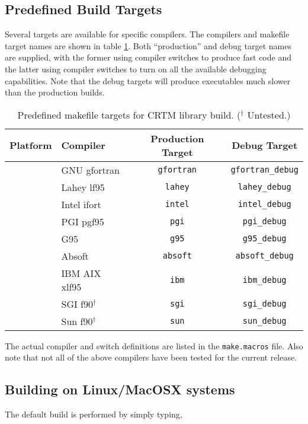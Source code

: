 \subsection{Predefined Build Targets}
Several targets are available for specific compilers. The compilers and makefile target names are shown in table \ref{tab:predefined_build_targets}. Both ``production'' and debug target names are supplied, with the former using compiler switches to produce fast code and the latter using compiler switches to turn on all the available debugging capabilities. Note that the debug targets will produce executables much slower than the production builds. 
\begin{table}[htp]
  \centering
  \begin{tabular}{|c|l|c|c|}
    \hline
    \sffamily\textbf{Platform} & \sffamily\textbf{Compiler} & \sffamily\textbf{Production Target} & \sffamily\textbf{Debug Target} \\
    \hline\hline
    &GNU gfortran      & \texttt{gfortran} & \texttt{gfortran\_debug}\\
    &Lahey lf95        & \texttt{lahey}    & \texttt{lahey\_debug}   \\
    &Intel ifort       & \texttt{intel}    & \texttt{intel\_debug}   \\
    &PGI pgf95         & \texttt{pgi}      & \texttt{pgi\_debug}     \\
    &G95               & \texttt{g95}      & \texttt{g95\_debug}     \\
    &Absoft            & \texttt{absoft}   & \texttt{absoft\_debug}  \\
    &IBM AIX xlf95     & \texttt{ibm}      & \texttt{ibm\_debug}     \\
    &SGI f90$^\dagger$ & \texttt{sgi}      & \texttt{sgi\_debug}     \\
    &Sun f90$^\dagger$ & \texttt{sun}      & \texttt{sun\_debug}     \\
    \hline
  \end{tabular}
  \caption{Predefined makefile targets for CRTM library build. ($^\dagger$ Untested.)}
  \label{tab:predefined_build_targets}
\end{table}

The actual compiler and switch definitions are listed in the \texttt{make.macros} file. Also note that not all of the above compilers have been tested for the current release.

\subsection{Building on Linux/MacOSX systems}
The default build is performed by simply typing,

